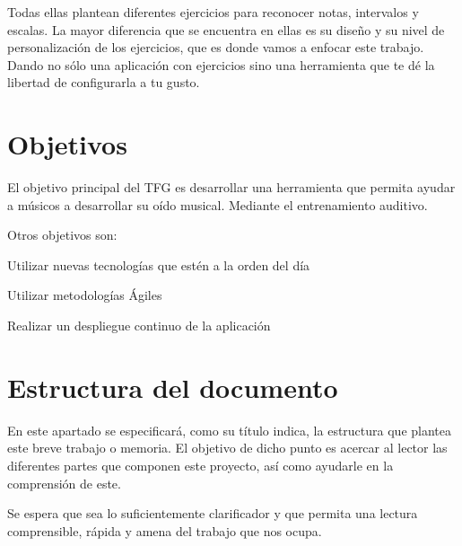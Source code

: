 \documentclass[12pt,twoside,titlepage]{report}
\begin{document}
Todas ellas plantean diferentes ejercicios para reconocer notas, intervalos y escalas. La mayor diferencia que se encuentra en ellas es su diseño y su nivel de personalización de los ejercicios, que es donde vamos a enfocar este trabajo. Dando no sólo una aplicación con ejercicios sino una herramienta que te dé la libertad de configurarla a tu gusto.

\section{Objetivos}

El objetivo principal del TFG es desarrollar una herramienta que permita ayudar a músicos a desarrollar su oído musical. Mediante el entrenamiento auditivo.

Otros objetivos son:
\begin{compactitem}
    \item Utilizar nuevas tecnologías que estén a la orden del día
    \item Utilizar metodologías Ágiles
    \item Realizar un despliegue continuo de la aplicación
\end{compactitem}

\section{Estructura del documento}

En este apartado se especificará, como su título indica, la estructura que plantea este breve trabajo o memoria. El objetivo de dicho punto es acercar al lector las diferentes partes que componen este proyecto, así como ayudarle en la comprensión de este.

Se espera que sea lo suficientemente clarificador y que permita una lectura comprensible, rápida y amena del trabajo que nos ocupa.
\end{document}
